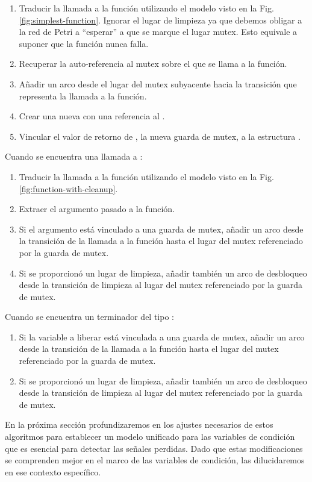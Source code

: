 \begin{enumerate}
      \item Traducir la llamada a la función utilizando el modelo visto en la Fig. \ref{fig:simplest-function}.
            Ignorar el lugar de limpieza ya que debemos obligar a la red de Petri a ``esperar'' a que se marque el lugar mutex.
            Esto equivale a suponer que la función  nunca falla.
      \item Recuperar la auto-referencia  al mutex sobre el que se llama a la función.
      \item Añadir un arco desde el lugar del mutex subyacente hacia la transición que representa la llamada a la función.
      \item Crear una nueva  con una referencia al .
      \item Vincular el valor de retorno de , la nueva guarda de mutex,
            a la estructura .
\end{enumerate}

Cuando se encuentra una llamada a :

\begin{enumerate}
      \item Traducir la llamada a la función utilizando el modelo visto en la Fig. \ref{fig:function-with-cleanup}.
      \item Extraer el argumento pasado a la función.
      \item Si el argumento está vinculado a una guarda de mutex, añadir un arco desde la transición de
            la llamada a la función hasta el lugar del mutex referenciado por la guarda de mutex.
      \item Si se proporcionó un lugar de limpieza, añadir también un arco de desbloqueo desde la
            transición de limpieza al lugar del mutex referenciado por la guarda de mutex.
\end{enumerate}

Cuando se encuentra un terminador del tipo :

\begin{enumerate}
      \item Si la variable a liberar está vinculada a una guarda de mutex, añadir un arco desde
            la transición de la llamada a la función hasta el lugar del mutex referenciado por la guarda de mutex.
      \item Si se proporcionó un lugar de limpieza, añadir también un arco de desbloqueo desde la
            transición de limpieza al lugar del mutex referenciado por la guarda de mutex.
\end{enumerate}

En la próxima sección profundizaremos en los ajustes necesarios de estos algoritmos para
establecer un modelo unificado para las variables de condición que es esencial para detectar las
señales perdidas. Dado que estas modificaciones se comprenden mejor en el marco de las
variables de condición, las dilucidaremos en ese contexto específico.
